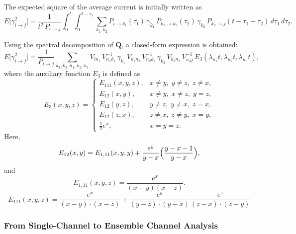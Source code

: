 \documentclass[pdflatex,sn-nature]{sn-jnl}%
\begin{document}
The expected square of the average current is initially written as
\begin{equation}
E\bigl[\overline{\gamma}_{i\rightarrow j}^2\bigr] = \frac{1}{t^2\,P_{i\rightarrow j}} \int_0^t\int_0^{t-\tau_1} \sum_{k_1,k_2} P_{i\rightarrow k_1}(\tau_1)\,\gamma_{k_1}\,P_{k_1\rightarrow k_2}(\tau_2)\,\gamma_{k_2}\,P_{k_2\rightarrow j}(t-\tau_1-\tau_2)\,d\tau_1\,d\tau_2.
\label{eq:expected_square_integral_short}
\end{equation}

Using the spectral decomposition of \(\mathbf{Q}\), a closed-form expression is obtained:
	\begin{equation}
	E\bigl[\overline{\gamma}_{i\rightarrow j}^2\bigr] = \frac{1}{P_{i\rightarrow j}} \sum_{k_1,k_2,n_1,n_2,n_3} V_{i n_1}\,V^{-1}_{n_1 k_1}\,\gamma_{k_1}\,V_{k_1 n_2}\,V^{-1}_{n_2 k_2}\,\gamma_{k_2}\,V_{k_2 n_3}\,V^{-1}_{n_3 j}\,E_3(\lambda_{n_1}t,\lambda_{n_2}t,\lambda_{n_3}t),
\label{eq:expected_square_closed_short}
\end{equation}
where the auxiliary function \(E_3\) is defined as
\begin{equation}
E_3(x,y,z)= 
\begin{cases}
E_{111}(x,y,z), & x\neq y,\; y\neq z,\; z\neq x,\\[1mm]
E_{12}(x,y),   & x\neq y,\; x\neq z,\; y=z,\\[1mm]
	E_{12}(y,z),   & y\neq z,\; y\neq x,\; z=x,\\[1mm]
	E_{12}(z,x),   & z\neq x,\; z\neq y,\; x=y,\\[1mm]
\frac{1}{2}e^x, & x=y=z.
\end{cases}
\label{eq:E3_short}
\end{equation}
Here,
	\begin{equation}
	E_{12}(x,y)= E_{1,11}(x,y,y) + \frac{e^y}{y-x}\Bigl(\frac{y-x-1}{y-x}\Bigr),
		\label{eq:E12_short}
		\end{equation}
		and
		\begin{equation}
		E_{1,11}(x,y,z)= \frac{e^x}{(x-y)(x-z)}.
	\label{eq:E1_11_short}
	\end{equation}
\begin{equation}
	E_{111}(x,y,z)= \frac{e^x}{(x-y)\cdot (x-z)} +\frac{e^y}{(y-z)\cdot (y-x)} \frac{e^z}{(z-x)\cdot (z-y)} 
    \label{eq:E111_short}
\end{equation}

    
\subsubsection{From Single-Channel to Ensemble Channel Analysis}
\end{document}
